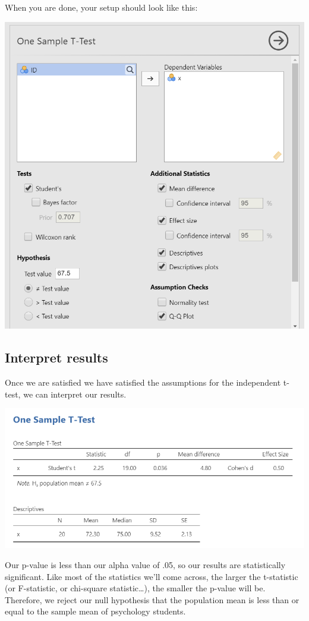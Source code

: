 \documentclass[
]{book}
\begin{document}
When you are done, your setup should look like this:

\includegraphics{images/07.1-one_sample_t-test/setup.png}

\hypertarget{interpret-results}{%
\subsection{Interpret results}\label{interpret-results}}

Once we are satisfied we have satisfied the assumptions for the independent t-test, we can interpret our results.

\includegraphics{images/07.1-one_sample_t-test/results.png}

Our p-value is less than our alpha value of .05, so our results are statistically significant. Like most of the statistics we'll come across, the larger the t-statistic (or F-statistic, or chi-square statistic\ldots), the smaller the p-value will be. Therefore, we reject our null hypothesis that the population mean is less than or equal to the sample mean of psychology students.
\end{document}
